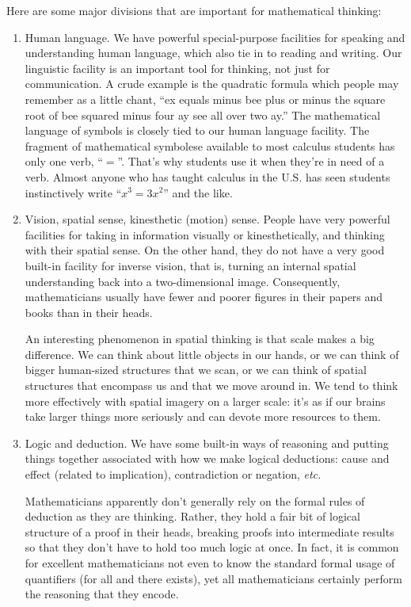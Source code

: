 \documentclass[12pt,oneside]{amsart}
\begin{document}
Here are some major divisions that are important for 
mathematical thinking: 
\begin{enumerate}
\item Human language.  We have powerful special-purpose
facilities for speaking and understanding human language, 
which also tie
in to reading and writing.  Our linguistic facility is an 
important
tool for thinking, not just for communication.  A crude
example is the quadratic formula which people may remember 
as a little chant,
``ex equals minus bee plus or minus the square root of bee 
squared
minus four ay see all over two ay.''   The
mathematical language of symbols is closely tied to our 
human language facility.
The fragment of mathematical symbolese available to most 
calculus students
has only one verb, ``$=$''.  That's why students use it
when they're in need of a verb.  Almost anyone who has 
taught calculus
in the U.S. has seen students instinctively write ``$x^3 
= 3 x^2$'' and the
like.
\item  Vision, spatial sense, kinesthetic (motion) sense.
People have very powerful facilities for taking in 
information visually
or kinesthetically, and thinking with their spatial sense. 
 On the other
hand, they do not have a very good built-in facility for 
inverse vision,
that is, turning an internal spatial understanding back 
into a two-dimensional
image.  Consequently, mathematicians usually have fewer 
and poorer
figures in their papers and books than in their heads.

An interesting phenomenon in spatial thinking is that 
scale makes
a big difference.  We can think about little objects in 
our hands, or we can
think of bigger human-sized structures that we scan, or we 
can think of
spatial structures that encompass us and that we move 
around in. 
We tend to think more effectively with spatial imagery on 
a larger scale:
it's as if our brains take larger things more seriously 
and can
devote more resources to them.

\item  Logic and deduction.  We have some built-in ways of
reasoning and putting things together associated with how 
we make logical
deductions:  cause and effect (related to implication),
contradiction or negation, {\it etc.} 

Mathematicians apparently don't generally
rely on the formal rules of deduction as they are 
thinking.  Rather, they hold
a fair bit of logical structure of a proof in their heads, 
breaking 
proofs into intermediate results so that they don't have 
to hold too much 
logic at once.  In fact, it is common for excellent 
mathematicians not even to
know the standard
formal usage of quantifiers (for all and there exists), 
yet all
mathematicians certainly perform the reasoning that they 
encode.


\end{enumerate}
\end{document}
